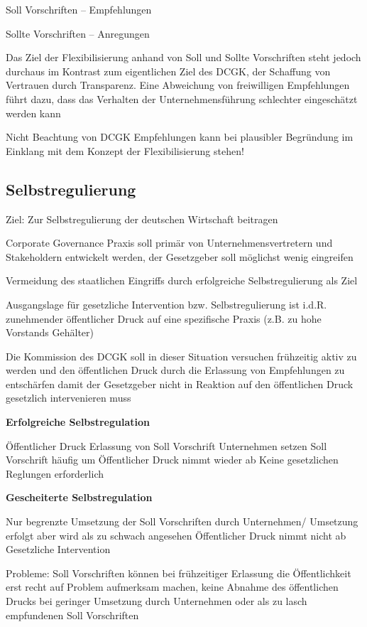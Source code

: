 \documentclass[
]{article}
\begin{document}
Soll Vorschriften -- Empfehlungen

Sollte Vorschriften -- Anregungen

Das Ziel der Flexibilisierung anhand von Soll und Sollte Vorschriften
steht jedoch durchaus im Kontrast zum eigentlichen Ziel des DCGK, der
Schaffung von Vertrauen durch Transparenz. Eine Abweichung von
freiwilligen Empfehlungen führt dazu, dass das Verhalten der
Unternehmensführung schlechter eingeschätzt werden kann

Nicht Beachtung von DCGK Empfehlungen kann bei plausibler Begründung im
Einklang mit dem Konzept der Flexibilisierung stehen!

\hypertarget{selbstregulierung}{%
\subsection{Selbstregulierung}\label{selbstregulierung}}

Ziel: Zur Selbstregulierung der deutschen Wirtschaft beitragen

Corporate Governance Praxis soll primär von Unternehmensvertretern und
Stakeholdern entwickelt werden, der Gesetzgeber soll möglichst wenig
eingreifen

Vermeidung des staatlichen Eingriffs durch erfolgreiche
Selbstregulierung als Ziel

Ausgangslage für gesetzliche Intervention bzw. Selbstregulierung ist
i.d.R. zunehmender öffentlicher Druck auf eine spezifische Praxis (z.B.
zu hohe Vorstands Gehälter)

Die Kommission des DCGK soll in dieser Situation versuchen frühzeitig
aktiv zu werden und den öffentlichen Druck durch die Erlassung von
Empfehlungen zu entschärfen damit der Gesetzgeber nicht in Reaktion auf
den öffentlichen Druck gesetzlich intervenieren muss

\textbf{Erfolgreiche Selbstregulation}

Öffentlicher Druck Erlassung von Soll Vorschrift Unternehmen setzen Soll
Vorschrift häufig um Öffentlicher Druck nimmt wieder ab Keine
gesetzlichen Reglungen erforderlich

\textbf{Gescheiterte Selbstregulation}

Nur begrenzte Umsetzung der Soll Vorschriften durch Unternehmen/
Umsetzung erfolgt aber wird als zu schwach angesehen Öffentlicher Druck
nimmt nicht ab Gesetzliche Intervention

Probleme: Soll Vorschriften können bei frühzeitiger Erlassung die
Öffentlichkeit erst recht auf Problem aufmerksam machen, keine Abnahme
des öffentlichen Drucks bei geringer Umsetzung durch Unternehmen oder
als zu lasch empfundenen Soll Vorschriften
\end{document}
